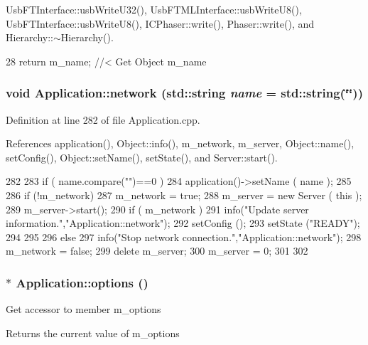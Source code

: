 UsbFTInterface::usbWriteU32(), UsbFTMLInterface::usbWriteU8(), UsbFTInterface::usbWriteU8(), ICPhaser::write(), Phaser::write(), and Hierarchy::$\sim$Hierarchy().


\begin{DoxyCode}
28 { return m_name; } //< Get Object m_name
\end{DoxyCode}
\hypertarget{classApplication_ab21cc0c86ca4e63d1fbd348d709dcddc}{
\subsubsection[{network}]{\setlength{\rightskip}{0pt plus 5cm}void Application::network (std::string {\em name} = {\ttfamily std::string(\char`\"{}\char`\"{})})}}
\label{classApplication_ab21cc0c86ca4e63d1fbd348d709dcddc}


Definition at line 282 of file Application.cpp.

References application(), Object::info(), m\_\-network, m\_\-server, Object::name(), setConfig(), Object::setName(), setState(), and Server::start().


\begin{DoxyCode}
282                                                           {
283   if ( name.compare("")==0 ) {
284     application()->setName ( name );
285   }
286   if (!m_network) {
287     m_network = true;
288     m_server = new Server ( this );
289     m_server->start();
290     if ( m_network ) {
291       info("Update server information.","Application::network");
292       setConfig ();
293       setState  ("READY");
294     }
295   }
296   else {
297     info("Stop network connection.","Application::network");
298     m_network = false;
299     delete m_server;
300     m_server = 0;
301   }
302 }
\end{DoxyCode}
\hypertarget{classApplication_ada7cc0e8db586985f1435aee0c79f47d}{
\subsubsection[{options}]{$\ast$ Application::options ()}}
\label{classApplication_ada7cc0e8db586985f1435aee0c79f47d}
Get accessor to member m\_\-options \begin{DoxyReturn}{Returns}
the current value of m\_\-options 
\end{DoxyReturn}



